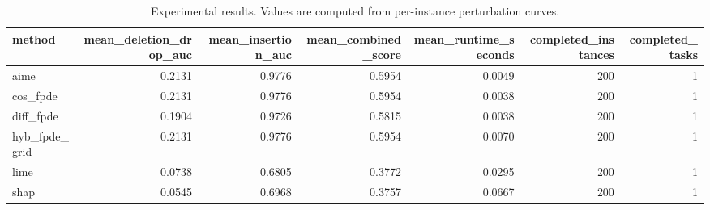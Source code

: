 \begin{table}[t]
\caption{Experimental results. Values are computed from per-instance perturbation curves.}
\label{tab:main_results_computed}
\centering
\begin{tabular}{lrrrrrr}
\toprule
method & mean\_deletion\_drop\_auc & mean\_insertion\_auc & mean\_combined\_score & mean\_runtime\_seconds & completed\_instances & completed\_tasks \\
\midrule
aime & 0.2131 & 0.9776 & 0.5954 & 0.0049 & 200 & 1 \\
cos\_fpde & 0.2131 & 0.9776 & 0.5954 & 0.0038 & 200 & 1 \\
diff\_fpde & 0.1904 & 0.9726 & 0.5815 & 0.0038 & 200 & 1 \\
hyb\_fpde\_grid & 0.2131 & 0.9776 & 0.5954 & 0.0070 & 200 & 1 \\
lime & 0.0738 & 0.6805 & 0.3772 & 0.0295 & 200 & 1 \\
shap & 0.0545 & 0.6968 & 0.3757 & 0.0667 & 200 & 1 \\
\bottomrule
\end{tabular}

\end{table}
